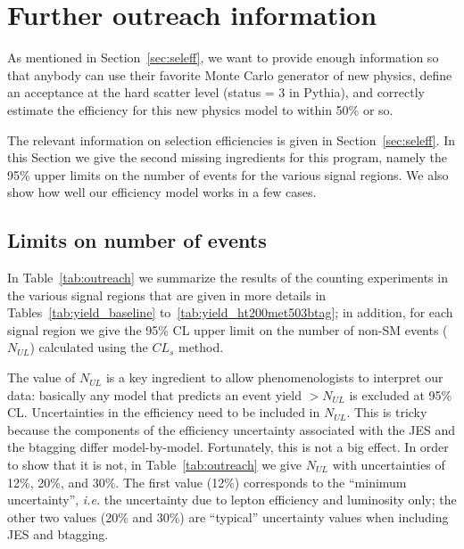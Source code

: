 

\section{Further outreach information}
\label{sec:outreach}
As mentioned in Section~\ref{sec:seleff}, we want to provide 
enough information so that anybody can use their favorite Monte Carlo
generator of new physics, define an acceptance at the hard 
scatter level (status = 3 in Pythia), and correctly estimate
the efficiency for this new physics model to within 50\% or so.

The relevant information on selection efficiencies is 
given in Section~\ref{sec:seleff}.  In this Section we give the 
second missing ingredients for this program, namely the 
95\% upper limits on the number of events for the various 
signal regions.  We also show how well our efficiency model 
works in a few cases.

\subsection{Limits on number of events}
\label{sec:outreachlimits}
In Table~\ref{tab:outreach} we summarize the 
results of the counting experiments in the various signal 
regions that are given in more 
details in Tables~\ref{tab:yield_baseline} 
to~\ref{tab:yield_ht200met503btag}; in addition, for each signal 
region we give the 95\% CL upper limit on the number of 
non-SM events ($N_{UL}$) calculated using the $CL_s$ method.

The value of $N_{UL}$ is a key ingredient to allow phenomenologists
to interpret our data: basically any model that predicts an 
event yield $> N_{UL}$ is excluded at 95\% CL.  Uncertainties 
in the efficiency need to be included in $N_{UL}$.  This is tricky 
because the components of the efficiency uncertainty associated 
with the JES and the btagging differ model-by-model.  Fortunately,
this is not a big effect.  In order to show that it is not, in 
Table~\ref{tab:outreach} we give $N_{UL}$ with uncertainties of 
12\%, 20\%, and 30\%. The first value (12\%) corresponds to the 
``minimum uncertainty'', {\em i.e.} the uncertainty due to 
lepton efficiency and luminosity only; the other two values (20\%
and 30\%) are ``typical'' uncertainty values when including
JES and btagging.

